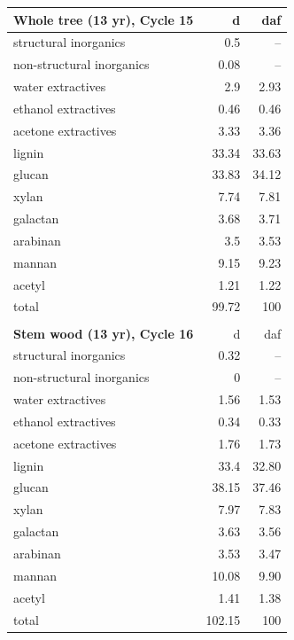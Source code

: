 \documentclass[12pt,titlepage]{article}
\begin{document}
\begin{longtable}{lrr}
    \textbf{Whole tree (13 yr), Cycle 15} & d & daf \\
    \midrule
    structural inorganics     & 0.5   & -- \\
    non-structural inorganics & 0.08  & -- \\
    water extractives         & 2.9   & 2.93 \\
    ethanol extractives       & 0.46  & 0.46 \\
    acetone extractives       & 3.33  & 3.36 \\
    lignin                    & 33.34 & 33.63 \\
    glucan                    & 33.83 & 34.12 \\
    xylan                     & 7.74  & 7.81 \\
    galactan                  & 3.68  & 3.71 \\
    arabinan                  & 3.5   & 3.53 \\
    mannan                    & 9.15  & 9.23 \\
    acetyl                    & 1.21  & 1.22 \\
    total                     & 99.72 & 100 \\
    \\

    \textbf{Stem wood (13 yr), Cycle 16} & d & daf \\
    \midrule
    structural inorganics     & 0.32   & -- \\
    non-structural inorganics & 0      & -- \\
    water extractives         & 1.56   & 1.53 \\
    ethanol extractives       & 0.34   & 0.33 \\
    acetone extractives       & 1.76   & 1.73 \\
    lignin                    & 33.4   & 32.80 \\
    glucan                    & 38.15  & 37.46 \\
    xylan                     & 7.97   & 7.83 \\
    galactan                  & 3.63   & 3.56 \\
    arabinan                  & 3.53   & 3.47 \\
    mannan                    & 10.08  & 9.90 \\
    acetyl                    & 1.41   & 1.38 \\
    total                     & 102.15 & 100 \\
\end{longtable}
\end{document}
